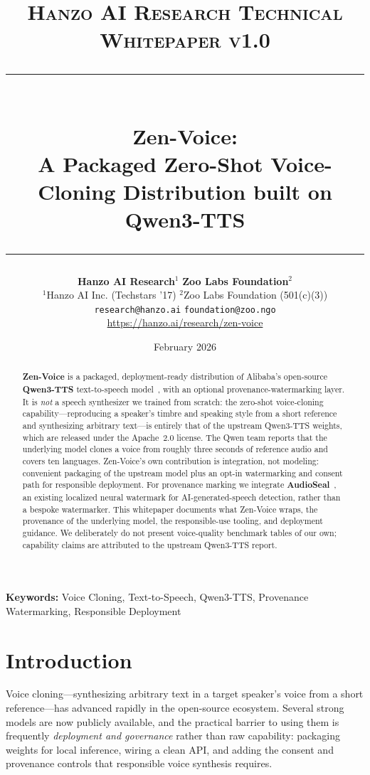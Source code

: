 \documentclass[11pt,a4paper]{article}
\title{
    \vspace{-1.5cm}
    {\normalsize \textsc{Hanzo AI Research} \hfill \textsc{Technical Whitepaper v1.0}} \\[0.8em]
    \rule{\linewidth}{0.5pt} \\[0.6em]
    {\LARGE \textbf{Zen-Voice:}} \\[0.3em]
    {\Large A Packaged Zero-Shot Voice-Cloning Distribution built on Qwen3-TTS} \\[0.3em]
    \rule{\linewidth}{0.5pt}
}
\author{    \textbf{Hanzo AI Research}$^{1}$ \quad \textbf{Zoo Labs Foundation}$^{2}$ \\[0.6em]
    $^{1}$Hanzo AI Inc. (Techstars '17) \quad $^{2}$Zoo Labs Foundation (501(c)(3)) \\[0.3em]
    \texttt{research@hanzo.ai} \quad \texttt{foundation@zoo.ngo} \\[0.3em]
    {\small \url{https://hanzo.ai/research/zen-voice}}
}
\date{February 2026}
\begin{document}
\maketitle

\begin{abstract}
\textbf{Zen-Voice} is a packaged, deployment-ready distribution of Alibaba's
open-source \textbf{Qwen3-TTS} text-to-speech model~\citep{qwen3tts}, with an
optional provenance-watermarking layer. It is \emph{not} a speech synthesizer we
trained from scratch: the zero-shot voice-cloning capability---reproducing a
speaker's timbre and speaking style from a short reference and synthesizing arbitrary
text---is entirely that of the upstream Qwen3-TTS weights, which are released under
the Apache~2.0 license. The Qwen team reports that the underlying model clones a voice
from roughly three seconds of reference audio and covers ten languages. Zen-Voice's
own contribution is integration, not modeling: convenient packaging of the upstream
model plus an opt-in watermarking and consent path for responsible deployment. For
provenance marking we integrate \textbf{AudioSeal}~\citep{san2024proactive}, an
existing localized neural watermark for AI-generated-speech detection, rather than a
bespoke watermarker. This whitepaper documents what Zen-Voice wraps, the provenance of
the underlying model, the responsible-use tooling, and deployment guidance. We
deliberately do not present voice-quality benchmark tables of our own; capability
claims are attributed to the upstream Qwen3-TTS report.
\end{abstract}

\vspace{0.5em}
\noindent\textbf{Keywords:} Voice Cloning, Text-to-Speech, Qwen3-TTS, Provenance Watermarking, Responsible Deployment

\section{Introduction}
\label{sec:introduction}

Voice cloning---synthesizing arbitrary text in a target speaker's voice from a short
reference---has advanced rapidly in the open-source ecosystem. Several strong models
are now publicly available, and the practical barrier to using them is frequently
\emph{deployment and governance} rather than raw capability: packaging weights for
local inference, wiring a clean API, and adding the consent and provenance controls
that responsible voice synthesis requires.
\end{document}
